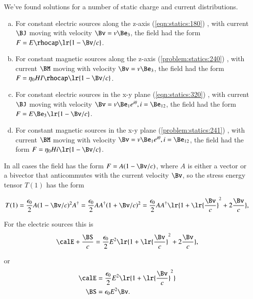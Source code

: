 %
%

We've found solutions for a number of static charge and current distributions.

\begin{enumerate}[(a)]
\item For constant electric sources along the z-axis
(\cref{eqn:statics:180})
, with current \( \BJ \) moving with velocity \( \Bv = v \Be_3 \), the field had the form \( F = E \rhocap \lr{ 1 - \Bv/c } \).
\item For constant magnetic sources along the z-axis
(\cref{problem:statics:240})
, with current \( \BM \) moving with velocity \( \Bv = v \Be_3 \), the field had the form \( F = \eta_0 H I \rhocap \lr{ 1 - \Bv/c } \).
\item For constant electric sources in the x-y plane
(\cref{eqn:statics:320})
, with current \( \BJ \) moving with velocity \( \Bv = v \Be_1 e^{i\theta}, i = \Be_{12} \), the field had the form \( F = E \Be_3 \lr{ 1 - \Bv/c } \).
\item For constant magnetic sources in the x-y plane
(\cref{problem:statics:241})
, with current \( \BM \) moving with velocity \( \Bv = v \Be_1 e^{i\theta}, i = \Be_{12} \), the field had the form \( F = \eta_0 H i \lr{ 1 - \Bv/c } \).
\end{enumerate}

In all cases the field has the form \( F = A ( 1 - \Bv/c ) \), where \( A \) is either a vector or a bivector that anticommutes with the current velocity \( \Bv \), so the stress energy tensor \( T(1) \) has the form

\begin{dmath}\label{eqn:poyntingF:860}
T(1)
= \frac{\epsilon_0}{2} A ( 1 - \Bv/c )^2 A^\dagger
= \frac{\epsilon_0}{2} A A^\dagger ( 1 + \Bv/c )^2
= \frac{\epsilon_0}{2} A A^\dagger \lr{ 1 + \lr{ \frac{\Bv}{c} }^2 + 2 \frac{\Bv}{c} },
\end{dmath}

For the electric sources this is
\begin{dmath}\label{eqn:poyntingF:880}
\calE + \frac{\BS}{c} = \frac{\epsilon_0}{2} E^2 \lr{ 1 + \lr{ \frac{\Bv}{c} }^2 + 2 \frac{\Bv}{c} },
\end{dmath}

or
\begin{dmath}\label{eqn:poyntingF:900}
\begin{aligned}
\calE &= \frac{\epsilon_0}{2} E^2 \lr{ 1 + \lr{ \frac{\Bv}{c} }^2 } \\
\BS &= \epsilon_0 E^2 \Bv.
\end{aligned}
\end{dmath}

